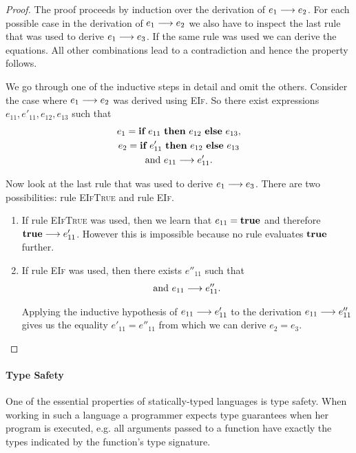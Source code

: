 {\begin{proof}
  The proof proceeds by induction over the derivation of ${e_1} \longrightarrow {e_2}$. For
  each possible case in the derivation of ${e_1} \longrightarrow {e_2}$ we also have to
  inspect the last rule that was used to derive ${e_1} \longrightarrow {e_3}$. If the same
  rule was used we can derive the equations. All other combinations lead to a
  contradiction and hence the property follows.

  We go through one of the inductive steps in detail and omit the
  others. Consider the case where ${e_1} \longrightarrow {e_2}$ was derived using
  \textsc{EIf}. So there exist expressions $e_{11}, e'_{11}, e_{12}, e_{13}$
  such that
  \begin{gather*}
    e_1 = \textbf{if}~{e_{11}}~\textbf{then}~{e_{12}}~\textbf{else}~{e_{13}}, \\
    e_2 = \textbf{if}~{e'_{11}}~\textbf{then}~{e_{12}}~\textbf{else}~{e_{13}} \\
    \text{and}~{e_{11}} \longrightarrow {e'_{11}}.
  \end{gather*}

  Now look at the last rule that was used to derive ${e_1} \longrightarrow {e_3}$. There are
  two possibilities: rule \textsc{EIfTrue} and rule \textsc{EIf}.

  \begin{enumerate}
  \item If rule \textsc{EIfTrue} was used, then we learn that $e_{11} = \textbf{true}$
    and therefore ${\textbf{true}} \longrightarrow {e'_{11}}$. However this is impossible because no
    rule evaluates $\textbf{true}$ further.

  \item If rule \textsc{EIf} was used, then there exists $e''_{11}$ such that
    \begin{gather*}
      \text{and}~{e_{11}} \longrightarrow {e''_{11}}.
    \end{gather*}

    Applying the inductive hypothesis of ${e_{11}} \longrightarrow {e'_{11}}$ to the
    derivation ${e_{11}} \longrightarrow {e''_{11}}$ gives us the equality
    $e'_{11} = e''_{11}$ from which we can derive $e_2 = e_3$.
  \end{enumerate}
\end{proof}



\paragraph{Type Safety}

One of the essential properties of statically-typed languages is type safety.
When working in such a language a programmer expects type guarantees when her
program is executed, e.g. all arguments passed to a function have exactly
the types indicated by the function's type signature.

}
